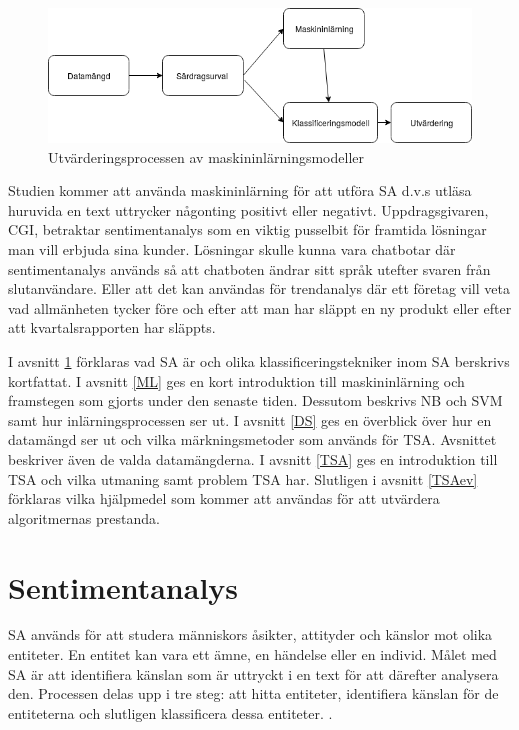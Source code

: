 \documentclass{kaumasters} %
\begin{document}
\begin{figure}[h]
\includegraphics[width=12cm]{oversiktsfigur}
\centering
\caption{Utvärderingsprocessen av maskininlärningsmodeller}
\label{fig:overfig}
\end{figure}

Studien kommer att använda maskininlärning för att utföra SA d.v.s utläsa huruvida en text uttrycker någonting positivt eller negativt. Uppdragsgivaren, CGI, betraktar sentimentanalys  som en viktig pusselbit för framtida lösningar man vill erbjuda sina kunder. Lösningar skulle kunna vara chatbotar där sentimentanalys används så att chatboten ändrar sitt språk utefter svaren från slutanvändare. Eller att det kan användas för trendanalys där ett företag vill veta vad allmänheten tycker före och efter att man har släppt en ny produkt eller efter att kvartalsrapporten har släppts.

I avsnitt \ref{SA} förklaras vad SA är och olika klassificeringstekniker inom SA berskrivs kortfattat. I avsnitt \ref{ML} ges en kort introduktion till maskininlärning och framstegen som gjorts under den senaste tiden. Dessutom beskrivs NB och SVM samt hur inlärningsprocessen ser ut. I avsnitt \ref{DS} ges en överblick över hur en datamängd ser ut och vilka märkningsmetoder som används för TSA. Avsnittet beskriver även de valda datamängderna. I avsnitt \ref{TSA} ges en introduktion till TSA och vilka utmaning samt problem TSA har. Slutligen i avsnitt \ref{TSAev} förklaras vilka hjälpmedel som kommer att användas för att utvärdera algoritmernas prestanda.


\section{Sentimentanalys} \label{SA}
SA används för att studera människors åsikter, attityder och känslor mot olika entiteter. En entitet kan vara ett ämne, en händelse eller en individ. Målet med SA är att identifiera känslan som är uttryckt i en text för att därefter analysera den. Processen delas upp i tre steg: att hitta entiteter, identifiera känslan för de entiteterna och slutligen klassificera dessa entiteter. \cite{SAsurvey}.
\end{document}
